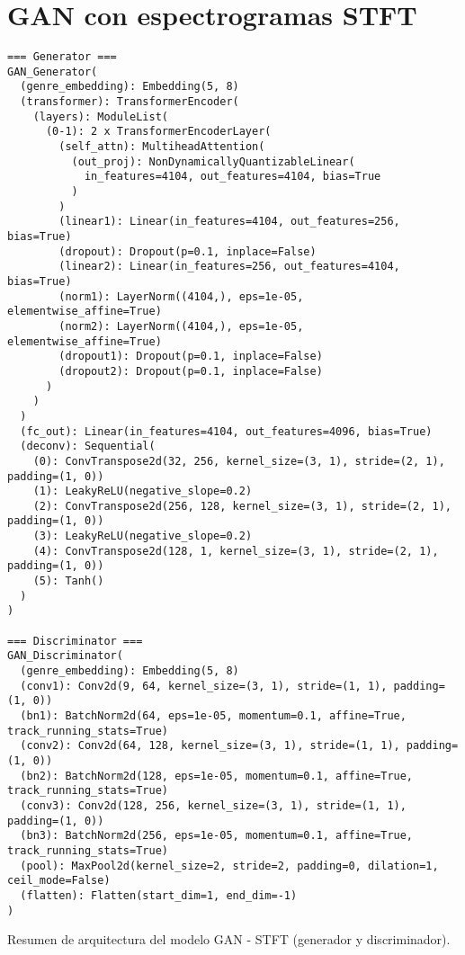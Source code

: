 \section{GAN con espectrogramas STFT}

\begin{table}[H]
\centering
\begin{minipage}{0.95\textwidth}
\begin{lstlisting}[basicstyle=\scriptsize\ttfamily]
=== Generator ===
GAN_Generator(
  (genre_embedding): Embedding(5, 8)
  (transformer): TransformerEncoder(
    (layers): ModuleList(
      (0-1): 2 x TransformerEncoderLayer(
        (self_attn): MultiheadAttention(
          (out_proj): NonDynamicallyQuantizableLinear(
            in_features=4104, out_features=4104, bias=True
          )
        )
        (linear1): Linear(in_features=4104, out_features=256, bias=True)
        (dropout): Dropout(p=0.1, inplace=False)
        (linear2): Linear(in_features=256, out_features=4104, bias=True)
        (norm1): LayerNorm((4104,), eps=1e-05, elementwise_affine=True)
        (norm2): LayerNorm((4104,), eps=1e-05, elementwise_affine=True)
        (dropout1): Dropout(p=0.1, inplace=False)
        (dropout2): Dropout(p=0.1, inplace=False)
      )
    )
  )
  (fc_out): Linear(in_features=4104, out_features=4096, bias=True)
  (deconv): Sequential(
    (0): ConvTranspose2d(32, 256, kernel_size=(3, 1), stride=(2, 1), padding=(1, 0))
    (1): LeakyReLU(negative_slope=0.2)
    (2): ConvTranspose2d(256, 128, kernel_size=(3, 1), stride=(2, 1), padding=(1, 0))
    (3): LeakyReLU(negative_slope=0.2)
    (4): ConvTranspose2d(128, 1, kernel_size=(3, 1), stride=(2, 1), padding=(1, 0))
    (5): Tanh()
  )
)

=== Discriminator ===
GAN_Discriminator(
  (genre_embedding): Embedding(5, 8)
  (conv1): Conv2d(9, 64, kernel_size=(3, 1), stride=(1, 1), padding=(1, 0))
  (bn1): BatchNorm2d(64, eps=1e-05, momentum=0.1, affine=True, track_running_stats=True)
  (conv2): Conv2d(64, 128, kernel_size=(3, 1), stride=(1, 1), padding=(1, 0))
  (bn2): BatchNorm2d(128, eps=1e-05, momentum=0.1, affine=True, track_running_stats=True)
  (conv3): Conv2d(128, 256, kernel_size=(3, 1), stride=(1, 1), padding=(1, 0))
  (bn3): BatchNorm2d(256, eps=1e-05, momentum=0.1, affine=True, track_running_stats=True)
  (pool): MaxPool2d(kernel_size=2, stride=2, padding=0, dilation=1, ceil_mode=False)
  (flatten): Flatten(start_dim=1, end_dim=-1)
)

\end{lstlisting}
\end{minipage}
\caption{Resumen de arquitectura del modelo GAN - STFT (generador y discriminador).}
\label{tab:gan_stft_model_summary}
\end{table}

